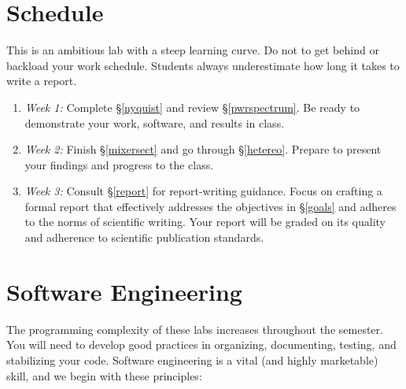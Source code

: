 \documentclass[11pt,preprint]{aastex}
\begin{document}
\section{Schedule}

\noindent
This is an ambitious lab with a steep learning curve.
Do not to get behind or backload your work schedule.
Students always underestimate how long it takes to write a report.

\begin{enumerate}
    \item {\it Week 1:} Complete \S \ref{nyquist} and review \S \ref{pwrspectrum}. Be ready to demonstrate your work, software, and results in class.
    \item {\it Week 2:} Finish \S \ref{mixersect} and go through \S \ref{hetereo}. Prepare to present your findings and progress to the class.
    \item {\it Week 3:} Consult \S \ref{report} for report-writing guidance. Focus on crafting a formal report that effectively addresses the objectives in \S\ref{goals} and adheres to the norms of scientific writing. Your report will be graded on its quality and adherence to scientific publication standards.
\end{enumerate}



\section{Software Engineering}

\noindent
The programming complexity of these labs increases throughout the semester.
You will need to develop good practices in organizing, documenting, testing, and
stabilizing your code. Software engineering is a vital (and highly marketable) skill, and we begin with
these principles:
\end{document}

